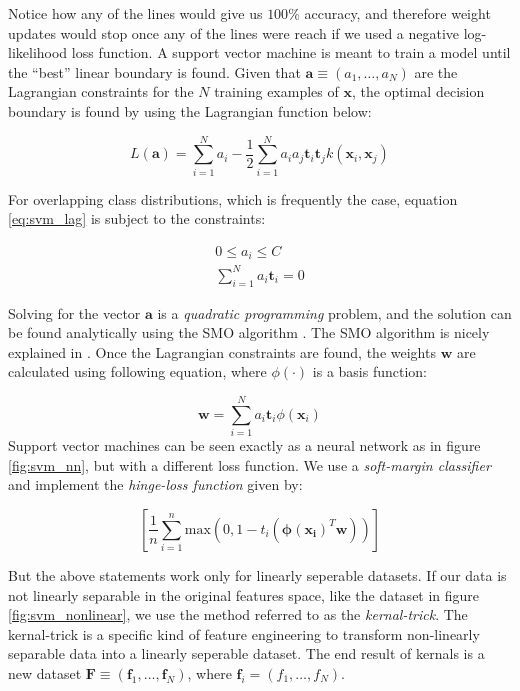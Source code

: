 \documentclass[11pt]{article}
\begin{document}
Notice how any of the lines would give us $100\%$ accuracy, and therefore weight updates would stop once any of the lines were reach if we used a negative log-likelihood loss function. A support vector machine is meant to train a model until the ``best'' linear boundary is found. Given that $\mathbf{a} \equiv \left(a_{1},\ldots,a_{N}\right)$ are the Lagrangian constraints for the $N$ training examples of $\mathbf{x}$, the optimal decision boundary is found by using the Lagrangian function below:

\begin{equation}\label{eq:svm_lag}
  L(\mathbf{a}) = \sum_{i=1}^{N}a_{i} - \frac{1}{2}\sum_{i=1}^{N}a_{i}a_{j}\mathbf{t}_{i}\mathbf{t}_{j}k\left(\mathbf{x}_{i},\mathbf{x}_{j}\right)
\end{equation}

For overlapping class distributions, which is frequently the case, equation \ref{eq:svm_lag} is subject to the constraints:

\begin{align}
  0 \leq a_{i} \leq C\label{eq:svm_constraint1}\\
  \sum_{i=1}^{N}a_{i}\mathbf{t}_{i} = 0\label{eq:svm_constraint2}
\end{align}

Solving for the vector $\mathbf{a}$ is a \emph{quadratic programming} problem, and the solution can be found analytically using the SMO algorithm \cite{Platt_smo}. The SMO algorithm is nicely explained in \cite{ng_smo}. Once the Lagrangian constraints are found, the weights $\mathbf{w}$ are calculated using following equation, where $\phi(\cdotp)$ is a basis function:

\begin{equation}\label{eq:svm_weights}
  \mathbf{w} = \sum_{i=1}^{N}a_{i}\mathbf{t}_{i}\phi\left(\mathbf{x}_{i}\right)
\end{equation}
Support vector machines can be seen exactly as a neural network as in figure \ref{fig:svm_nn}, but with a different loss function. We use a \emph{soft-margin classifier} and implement the \emph{hinge-loss function} given by:

\begin{equation}
  \left[\frac{1}{n}\sum^{n}_{i=1}\mathrm{max}\left(0,1 - t_{i}\left(\mathbf{\phi(x_{i})}^{T}\mathbf{w}\right)\right)\right]
  \label{eq:hinge_loss}
\end{equation}

But the above statements work only for linearly seperable datasets. If our data is not linearly separable in the original features space, like the dataset in figure \ref{fig:svm_nonlinear}, we use the method referred to as the \emph{kernal-trick}. The kernal-trick is a specific kind of feature engineering to transform non-linearly separable data into a linearly seperable dataset. The end result of kernals is a new dataset $\mathbf{F} \equiv \left(\mathbf{f}_{1},\ldots,\mathbf{f}_{N}\right)$, where $\mathbf{f}_{i} = \left(f_{1},\ldots,f_{N}\right)$. 
\end{document}
